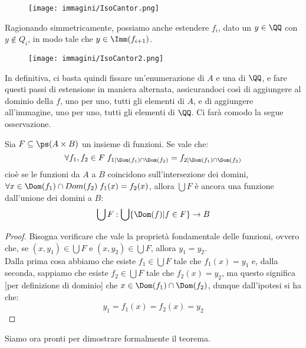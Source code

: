 \documentclass[11pt]{scrartcl}
\begin{document}
\begin{figure}[h]
	\centering
	\texttt{[image: immagini/IsoCantor.png]}
\end{figure}

Ragionando simmetricamente, possiamo anche estendere $f_i$, dato un $y \in \QQ$ con $y \not\in Q_i$, in modo tale che $y \in \Imm(f_{i+1})$.

\begin{center}
	\begin{figure}[h!]
		\centering
		\texttt{[image: immagini/IsoCantor2.png]}
	\end{figure}
\end{center}

In definitiva, ci basta quindi fissare un'enumerazione di $A$ e una di $\QQ$, e fare questi passi di estensione in maniera alternata, assicurandoci così di aggiungere al dominio della $f$, uno per uno,
tutti gli elementi di $A$, e di aggiungere all'immagine, uno per uno, tutti gli elementi di $\QQ$. Ci farà comodo la segue osservazione.

\begin{remark}
	Sia $F \subseteq \ps(A \times B)$ un insieme di funzioni. Se vale che:	
	\[ \forall f_1,f_2 \in F \; f_{1|\Dom(f_1) \cap \Dom(f_2)} = f_{2|\Dom(f_1) \cap \Dom(f_2)}
			\]
	cioè se le funzioni da $A$ a $B$ coincidono sull'intersezione dei domini, $\forall x \in \Dom(f_1) \cap Dom(f_2) \; f_1(x) = f_2(x)$, allora $\bigcup F$ è ancora una funzione dall'unione dei domini a $B$:
	\[ \bigcup F : \bigcup\{\Dom(f) | f\in F\} \rightarrow B
		\]
\end{remark}

\begin{proof}
	Bisogna verificare che vale la proprietà fondamentale delle funzioni, ovvero che, se $(x,y_1) \in \bigcup F$ e $(x,y_2) \in \bigcup F$, allora $y_1 = y_2$.\\
	Dalla prima cosa abbiamo che esiste $f_1 \in \bigcup F$ tale che $f_1(x) = y_1$ e, dalla seconda, sappiamo che esiste $f_2 \in \bigcup F$ tale che $f_2(x) = y_2$, ma questo significa [per definizione di dominio]
	che $x \in \Dom(f_1) \cap \Dom(f_2)$, dunque dall'ipotesi si ha che:
	\[ y_1 = f_1(x) = f_2(x) = y_2
		\]
\end{proof}

Siamo ora pronti per dimostrare formalmente il teorema.
\end{document}
